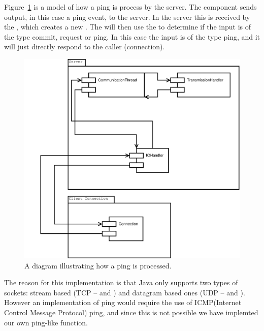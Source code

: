 Figure~\ref{fig:IOPing} is a model of how a ping is process by the server. The  component sends output, in this case a ping event, to the server. In the server this is received by the , which creates a new \newline {}.
The  will then use the \newline {} to determine if the input is of the type commit, request or ping.
In this case the input is of the type ping, and it will just directly respond to the caller (connection).
\begin{figure}[htbp]
	\centering
          \includegraphics[scale=0.30]{images/ping}%
	\caption{A diagram illustrating how a ping is processed.} 
	\label{fig:IOPing}
\end{figure}

The reason for this implementation is that Java only supports two types of sockets: stream based (TCP --  and ) and datagram based ones (UDP --  \newline and )\cite{ICMP}\cite{javaNET}. However an implementation of ping would require the use of ICMP(Internet Control Message Protocol) ping, and since this is not possible we have implemted our own ping-like function.


